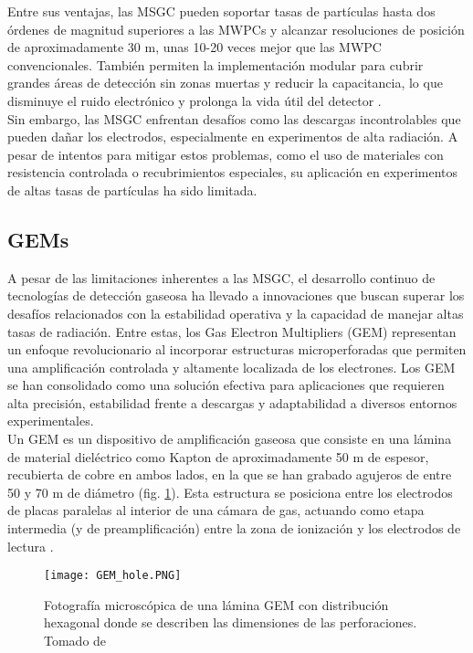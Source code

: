 \documentclass{report}
\begin{document}
\noindent Entre sus ventajas, las MSGC pueden soportar tasas de partículas hasta dos órdenes de magnitud superiores a las MWPCs y alcanzar resoluciones de posición de aproximadamente 30 \textmu m, unas 10-20 veces mejor que las MWPC convencionales. También permiten la implementación modular para cubrir grandes áreas de detección sin zonas muertas y reducir la capacitancia, lo que disminuye el ruido electrónico y prolonga la vida útil del detector \cite{giomataris1996micromegas}.\\

\noindent Sin embargo, las MSGC enfrentan desafíos como las descargas incontrolables que pueden dañar los electrodos, especialmente en experimentos de alta radiación. A pesar de intentos para mitigar estos problemas, como el uso de materiales con resistencia controlada o recubrimientos especiales, su aplicación en experimentos de altas tasas de partículas ha sido limitada.\\

\subsection{GEMs}

\noindent A pesar de las limitaciones inherentes a las MSGC, el desarrollo continuo de tecnologías de detección gaseosa ha llevado a innovaciones que buscan superar los desafíos relacionados con la estabilidad operativa y la capacidad de manejar altas tasas de radiación. Entre estas, los Gas Electron Multipliers (GEM) representan un enfoque revolucionario al incorporar estructuras microperforadas que permiten una amplificación controlada y altamente localizada de los electrones. Los GEM se han consolidado como una solución efectiva para aplicaciones que requieren alta precisión, estabilidad frente a descargas y adaptabilidad a diversos entornos experimentales. \\

\noindent Un GEM es un dispositivo de amplificación gaseosa que consiste en una lámina de material dieléctrico como Kapton de aproximadamente 50 \textmu m de espesor, recubierta de cobre en ambos lados, en la que se han grabado agujeros de entre 50 y 70 \textmu m de diámetro (fig. \ref{fig:gem_hole}). Esta estructura se posiciona entre los electrodos de placas paralelas al interior de una cámara de gas, actuando como etapa intermedia (y de preamplificación) entre la zona de ionización y los electrodos de lectura \cite{kolanoski2020particle4}.

\begin{figure}[H]
    \centering
    \texttt{[image: GEM\_hole.PNG]}
    \caption{Fotografía microscópica de una lámina GEM con distribución hexagonal donde se describen las dimensiones de las perforaciones. Tomado de \cite{sauli1997gem} }
    \label{fig:gem_hole}
\end{figure}
\end{document}
